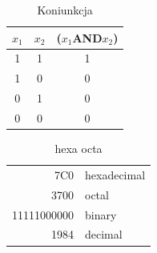 \documentclass{article}
\begin{document}
\begin{table}
\begin{center}
\caption{Koniunkcja }
\begin{tabular}{c|c|c}
\hline
\hline 
$x_{1}$ & $x_{2}$ & ($x_{1}$AND$x_{2}$)  \\ \hline
1 & 1 & 1 \\ 
1 & 0 & 0 \\
0 & 1 & 0 \\
0 & 0 & 0 \\
\hline \hline
\end{tabular}
\end{center}
\end{table}

\begin{table}
\begin{center}
\caption{hexa octa}
\begin{tabular}{|r|l|}
\hline
7C0 & hexadecimal \\
3700 & octal \\ \cline{2-2}
11111000000 & binary \\ 
\hline
\hline 
1984 & decimal \\ \hline
\end{tabular}
\end{center}
\end{table}
\end{document}
